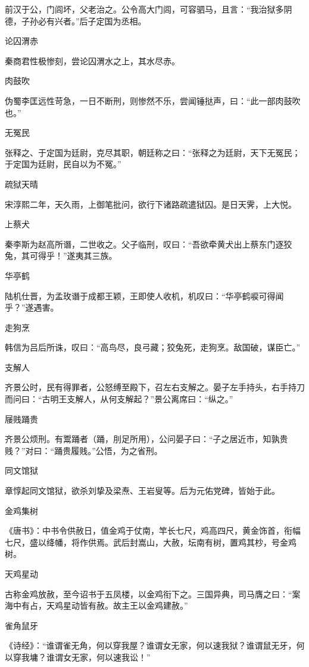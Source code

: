 \documentclass[a4paper,12pt,UTF8,twoside]{ctexbook}
\begin{document}
    前汉于公，门闾坏，父老治之。公令高大门闾，可容驷马，且言：“我治狱多阴德，子孙必有兴者。”后子定国为丞相。
    
    论囚渭赤
    
    秦商君性极惨刻，尝论囚渭水之上，其水尽赤。
    
    肉鼓吹
    
    伪蜀李匡远性苛急，一日不断刑，则惨然不乐，尝闻锤挞声，曰：“此一部肉鼓吹也。”
    
    无冤民
    
    张释之、于定国为廷尉，克尽其职，朝廷称之曰：“张释之为廷尉，天下无冤民；于定国为廷尉，民自以为不冤。”
    
    疏狱天晴
    
    宋淳熙二年，天久雨，上御笔批问，欲行下诸路疏遣狱囚。是日天霁，上大悦。
    
    上蔡犬
    
    秦李斯为赵高所谮，二世收之。父子临刑，叹曰：“吾欲牵黄犬出上蔡东门逐狡兔，其可得乎！”遂夷其三族。
    
    华亭鹤
    
    陆机仕晋，为孟玫谮于成都王颖，王即使人收机，机叹曰：“华亭鹤唳可得闻乎？”遂遇害。
    
    走狗烹
    
    韩信为吕后所诛，叹曰：“高鸟尽，良弓藏；狡兔死，走狗烹。敌国破，谋臣亡。”
    
    支解人
    
    齐景公时，民有得罪者，公怒缚至殿下，召左右支解之。晏子左手持头，右手持刀而问曰：“古明王支解人，从何支解起？”景公离席曰：“纵之。”
    
    屦贱踊贵
    
    齐景公烦刑。有鬻踊者（踊，刖足所用），公问晏子曰：“子之居近市，知孰贵贱？”对曰：“踊贵履贱。”公悟，为之省刑。
    
    同文馆狱
    
    章惇起同文馆狱，欲杀刘挚及梁焘、王岩叟等。后为元佑党碑，皆始于此。
    
    金鸡集树
    
    《唐书》：中书令供赦日，值金鸡于仗南，竿长七尺，鸡高四尺，黄金饰首，衔幅七尺，盛以绛幡，将作供焉。武后封嵩山，大赦，坛南有树，置鸡其杪，号金鸡树。
    
    天鸡星动
    
    古称金鸡放赦，至今诏书于五凤楼，以金鸡衔下之。三国异典，司马膺之曰：“案海中有占，天鸡星动皆有赦。故主王以金鸡建赦。”
    
    雀角鼠牙
    
    《诗经》：“谁谓雀无角，何以穿我屋？谁谓女无家，何以速我狱？谁谓鼠无牙，何以穿我墉？谁谓女无家，何以速我讼！”
    
\end{document}
